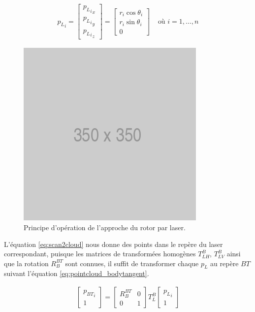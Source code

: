 \begin{align}
  {p_{L}}_i = \begin{bmatrix}
    {{p_L}_i}_x \\
    {{p_L}_i}_y \\
    {{p_L}_i}_z
  \end{bmatrix} = \begin{bmatrix}r_i \cos \theta_i \\ r_i \sin \theta_i \\ 0 \end{bmatrix} & \text{ où } i=1,\ldots,n
    \label{eq:scan2cloud}
\end{align}

\begin{figure}[htp]
  \centering
  \includegraphics[width=0.5\linewidth]{images/placeholder.png}
  \caption{Principe d'opération de l'approche du rotor par laser.}
  \label{fig:approach}
\end{figure}

L'équation \ref{eq:scan2cloud} nous donne des points dans le repère du laser correspondant, puisque les matrices de transformées homogènes $T_{LH}^B$, $T_{LV}^B$ ainsi que la rotation $R_B^{BT}$ sont connues, il suffit de transformer chaque $p_L$ au repère ${BT}$ suivant l'équation \ref{eq:pointcloud_bodytangent}.

\begin{align}
  \begin{bmatrix}{p_{BT}}_i \\ 1\end{bmatrix} = \begin{bmatrix}
    R_B^{BT} & 0 \\
    0 & 1
  \end{bmatrix} T_{L}^B\begin{bmatrix}{p_{L}}_i \\ 1\end{bmatrix}
  \label{eq:pointcloud_bodytangent}
\end{align}

